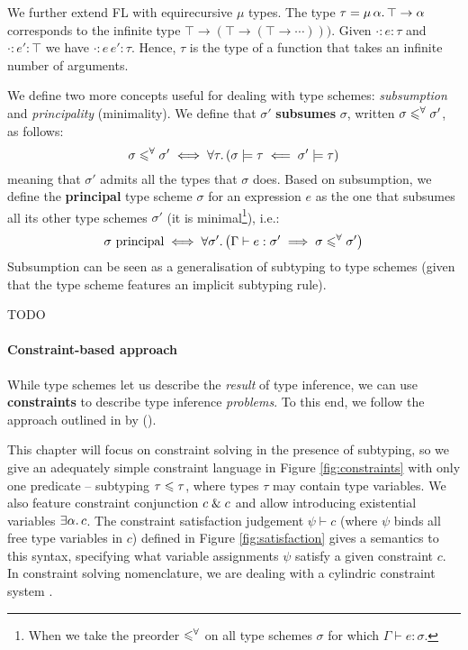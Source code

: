 \begin{example}
    We further extend FL with equirecursive $\mu$ types. 
    The type $\tau = \mu\,{\alpha}\ldotp \top \to \alpha$ corresponds to the infinite type $\top \to (\top \to (\top \to \cdots)))$. Given $\cdot : e : \tau$ and $\cdot : e' : \top$ we have $\cdot : e\,e' : \tau$. Hence, $\tau$ is the type of a function that takes an infinite number of arguments.
\end{example}

We define two more concepts useful for dealing with type schemes: \emph{subsumption} and \emph{principality} (minimality). We define that $\sigma'$ \textbf{subsumes} $\sigma$, written $\sigma \leqslant^\forall \sigma'$, as follows:
$$ \sigma \leqslant^\forall \sigma' \iff \forall \tau \ldotp (\sigma \models \tau \impliedby \sigma' \models \tau) $$
meaning that $\sigma'$ admits all the types that $\sigma$ does.
Based on subsumption, we define the \textbf{principal} type scheme $\sigma$ for an expression $e$ as the one that subsumes all its other type schemes $\sigma'$ (it is minimal\footnote{When we take the preorder $\leqslant^\forall$ on all type schemes $\sigma$ for which $\Gamma \vdash e : \sigma$.}), i.e.\@:
$$ \sigma\text{ principal} \iff \forall \sigma' \ldotp \left( \Gamma \vdash e : \sigma' \implies \sigma \subsume \sigma' \right) $$
Subsumption can be seen as a generalisation of subtyping to type schemes (given that the type scheme features an implicit subtyping rule). 

\begin{example}
    {\color{red} TODO} 
\end{example}

\paragraph{Constraint-based approach} While type schemes let us describe the \emph{result} of type inference, we can use \textbf{constraints} to describe type inference \emph{problems}. To this end, we follow the approach outlined in  by \textcite{essence-of-ml-type-inference} (\textcite[Chapter~10]{adv-tapl}).

This chapter will focus on constraint solving in the presence of subtyping, so we give an adequately simple constraint language in Figure \ref{fig:constraints} with only one predicate -- subtyping $\tau \leqslant \tau$, where types $\tau$ may contain type variables. We also feature constraint conjunction $c \;\&\; c$ and allow introducing existential variables $\exists \alpha \ldotp c$. The constraint satisfaction judgement $\psi \vdash c$ (where $\psi$ binds all free type variables in $c$) defined in Figure \ref{fig:satisfaction} gives a semantics to this syntax, specifying what variable assignments $\psi$ satisfy a given constraint $c$. In constraint solving nomenclature, we are dealing with a cylindric constraint system \cite{constraint-based-hm}. 

